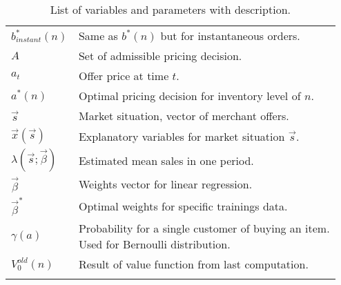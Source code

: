 \begin{longtable}{ll}
		$b^*_{instant}(n)$ & Same as $b^*(n)$ but for instantaneous orders. \\
		$A$ & Set of admissible pricing decision. \\
		$a_t$ & Offer price at time $t$. \\
		$a^*(n)$ & Optimal pricing decision for inventory level of $n$. \\
		$\vec{s}$ & Market situation, vector of merchant offers. \\
		$\vec{x}(\vec{s})$ & Explanatory variables for market situation $\vec{s}$. \\
		$\lambda(\vec{s}; \vec{\beta})$ & Estimated mean sales in one period. \\
		$\vec{\beta}$ & Weights vector for linear regression. \\
		$\vec{\beta}^*$ & Optimal weights for specific trainings data. \\
		$\gamma(a)$ & \makecell[l]{Probability for a single customer of buying an item. \\ Used for Bernoulli distribution.} \\
		$V_0^{old}(n)$ & Result of value function from last computation. \\
		\bottomrule
	\caption{List of variables and parameters with description.}
	\label{tab:notations}
\end{longtable}
